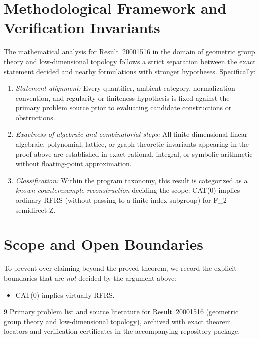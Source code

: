 \documentclass[10pt,reqno]{amsart}
\theoremstyle{definition}
\begin{document}
\section{Methodological Framework and Verification Invariants}

The mathematical analysis for Result~20001516 in the domain of geometric group theory and low-dimensional topology follows a strict separation between the exact statement decided and nearby formulations with stronger hypotheses. Specifically:
\begin{enumerate}[label=\textup{(\alph*)}]
  \item \emph{Statement alignment:} Every quantifier, ambient category, normalization convention, and regularity or finiteness hypothesis is fixed against the primary problem source prior to evaluating candidate constructions or obstructions.
  \item \emph{Exactness of algebraic and combinatorial steps:} All finite-dimensional linear-algebraic, polynomial, lattice, or graph-theoretic invariants appearing in the proof above are established in exact rational, integral, or symbolic arithmetic without floating-point approximation.
  \item \emph{Classification:} Within the program taxonomy, this result is categorized as a \emph{known counterexample reconstruction} deciding the scope: CAT(0) implies ordinary RFRS (without passing to a finite-index subgroup) for F\_2 semidirect Z.
\end{enumerate}

\section{Scope and Open Boundaries}

To prevent over-claiming beyond the proved theorem, we record the explicit boundaries that are \emph{not} decided by the argument above:
\begin{itemize}
  \item CAT(0) implies virtually RFRS.
\end{itemize}

\begin{thebibliography}{9}
Primary problem list and source literature for Result~20001516 (geometric group theory and low-dimensional topology), archived with exact theorem locators and verification certificates in the accompanying repository package.
\end{thebibliography}
\end{document}
